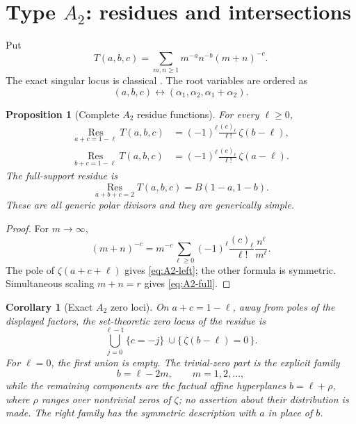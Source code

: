 \documentclass[11pt]{article}
\newtheorem{proposition}[theorem]{Proposition}
\newtheorem{corollary}[theorem]{Corollary}
\renewcommand{\boxed}[1]{#1}
\newcommand{\Res}{\operatorname*{Res}}
\begin{document}
\section{Type \texorpdfstring{$A_2$}{A2}: residues and intersections}
\label{sec:A2}

Put
\begin{equation}\label{eq:Tornheim}
 T(a,b,c)=\sum_{m,n\ge1}m^{-a}n^{-b}(m+n)^{-c}.
\end{equation}
The exact singular locus is classical
\cite{MatsumotoTsumura2006,MNOST2008}.  The root variables are ordered
as
\[
 (a,b,c)\longleftrightarrow
 (\alpha_1,\alpha_2,\alpha_1+\alpha_2).
\]

\begin{proposition}[Complete \(A_2\) residue functions]\label{prop:A2}
For every \(\ell\ge0\),
\begin{align}
 \Res_{a+c=1-\ell}T(a,b,c)
 &=(-1)^\ell\frac{(c)_\ell}{\ell!}\,\zeta(b-\ell),
 \label{eq:A2-left}\\
 \Res_{b+c=1-\ell}T(a,b,c)
 &=(-1)^\ell\frac{(c)_\ell}{\ell!}\,\zeta(a-\ell).
 \label{eq:A2-right}
\end{align}
The full-support residue is
\begin{equation}\label{eq:A2-full}
 \Res_{a+b+c=2}T(a,b,c)=B(1-a,1-b).
\end{equation}
These are all generic polar divisors and they are generically simple.
\end{proposition}

\begin{proof}
For \(m\to\infty\),
\[
 (m+n)^{-c}
 =
 m^{-c}\sum_{\ell\ge0}
 (-1)^\ell\frac{(c)_\ell}{\ell!}\frac{n^\ell}{m^\ell}.
\]
The pole of \(\zeta(a+c+\ell)\) gives \eqref{eq:A2-left};
the other formula is symmetric.  Simultaneous scaling
\(m+n=r\) gives \eqref{eq:A2-full}.
\end{proof}

\begin{corollary}[Exact \(A_2\) zero loci]\label{cor:A2-zero}
On \(a+c=1-\ell\), away from poles of the displayed factors,
the set-theoretic zero locus of the residue is
\[
 \boxed{
 \bigcup_{j=0}^{\ell-1}\{c=-j\}
 \ \cup
 \{\,\zeta(b-\ell)=0\,\}.}
\]
For \(\ell=0\), the first union is empty.  The trivial-zero part is the
explicit family
\[
 b=\ell-2m,\qquad m=1,2,\ldots,
\]
while the remaining components are the factual affine hyperplanes
\(b=\ell+\rho\), where \(\rho\) ranges over nontrivial zeros of
\(\zeta\); no assertion about their distribution is made.
The right family has the symmetric description with \(a\) in place of
\(b\).
\end{corollary}
\end{document}
